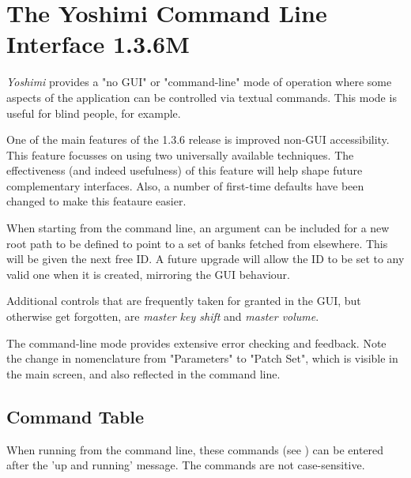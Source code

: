 %
%
%

\section{The Yoshimi Command Line Interface 1.3.6M}
\label{sec:command_line}

   \textsl{Yoshimi} provides a "no GUI" or "command-line" mode of operation
   where some aspects of the application can be controlled via textual commands.
   This mode is useful for blind people, for example.

   One of the main features of the 1.3.6 release is improved non-GUI
   accessibility.  This feature focusses on using two universally available
   techniques. The effectiveness (and indeed usefulness) of this feature
   will help shape future complementary interfaces. Also, a number of
   first-time defaults have been changed to make this feataure easier.

   When starting from the command line, an argument can be included for a new
   root path to be defined to point to a set of banks fetched from elsewhere.
   This will be given the next free ID. A future upgrade will allow the ID to
   be set to any valid one when it is created, mirroring the GUI behaviour.

   Additional controls that are frequently taken for granted in the GUI, but
   otherwise get forgotten, are \textsl{master key shift}
   and \textsl{master volume}.

   The command-line mode provides extensive error checking and feedback.
   Note the change in nomenclature from "Parameters" to "Patch Set", which is
   visible in the main screen, and also reflected in the command line.

\subsection{Command Table}
\label{subsec:command_line_command_table}

   When running from the command line, these commands
   (see )
   can be entered after the 'up and running' message.
   The commands are not case-sensitive.

